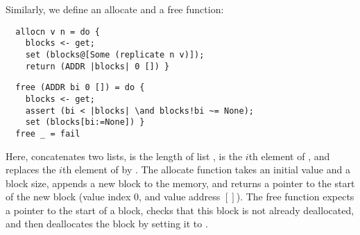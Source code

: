 \documentclass[a4paper,USenglish,cleveref, autoref]{lipics-v2019}
\begin{document}
%
% 
% 
%
Similarly, we define an allocate and a free function:\\
\begin{minipage}[t]{.46\textwidth}
\begin{lstlisting}
  allocn v n = do {
    blocks <- get; 
    set (blocks@[Some (replicate n v)]);
    return (ADDR |blocks| 0 []) }
\end{lstlisting}
\end{minipage}
\hfill
\begin{minipage}[t]{.52\textwidth}
\begin{lstlisting}
  free (ADDR bi 0 []) = do {
    blocks <- get; 
    assert (bi < |blocks| \and blocks!bi ~= None);
    set (blocks[bi:=None]) }
  free _ = fail
\end{lstlisting}
\end{minipage}
Here,  concatenates two lists,  is the length of list ,  is the $i$th 
element of , and  replaces the $i$th element of  by .
The allocate function takes an initial value and a block size, appends a new block to the memory, and returns a pointer to the start of the new block (value index $0$, and value address $[]$).
The free function expects a pointer to the start of a block,
checks that this block is not already deallocated, and then deallocates the block by setting it to .
\end{document}

